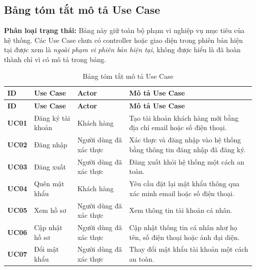 \subsection{Bảng tóm tắt mô tả Use Case}

\textbf{Phân loại trạng thái:} Bảng này giữ toàn bộ phạm vi nghiệp vụ mục tiêu của hệ thống. Các Use Case chưa có controller hoặc giao diện trong phiên bản hiện tại được xem là \textit{ngoài phạm vi phiên bản hiện tại}, không được hiểu là đã hoàn thành chỉ vì có mô tả trong bảng.

\begin{longtable}{|p{1.2cm}|p{3.5cm}|p{2.8cm}|p{6.5cm}|}

\caption{Bảng tóm tắt mô tả Use Case}
\label{tab:tom-tat-use-case}
\\

\hline
\textbf{ID} &
\textbf{Use Case} &
\textbf{Actor} &
\textbf{Mô tả Use Case} \\
\hline

\endfirsthead

\hline
\textbf{ID} &
\textbf{Use Case} &
\textbf{Actor} &
\textbf{Mô tả Use Case} \\
\hline

\endhead

\hline
\endfoot

\textbf{UC01} & Đăng ký tài khoản & Khách hàng &
Tạo tài khoản khách hàng mới bằng địa chỉ email hoặc số điện thoại. \\
\hline

\textbf{UC02} & Đăng nhập & Người dùng đã xác thực &
Xác thực và đăng nhập vào hệ thống bằng thông tin đăng nhập đã đăng ký. \\
\hline

\textbf{UC03} & Đăng xuất & Người dùng đã xác thực &
Đăng xuất khỏi hệ thống một cách an toàn. \\
\hline

\textbf{UC04} & Quên mật khẩu & Khách hàng &
Yêu cầu đặt lại mật khẩu thông qua xác minh email hoặc số điện thoại. \\
\hline

\textbf{UC05} & Xem hồ sơ & Người dùng đã xác thực &
Xem thông tin tài khoản cá nhân. \\
\hline

\textbf{UC06} & Cập nhật hồ sơ & Người dùng đã xác thực &
Cập nhật thông tin cá nhân như họ tên, số điện thoại hoặc ảnh đại diện. \\
\hline

\textbf{UC07} & Đổi mật khẩu & Người dùng đã xác thực &
Thay đổi mật khẩu tài khoản một cách an toàn. \\
\hline


\end{longtable}
